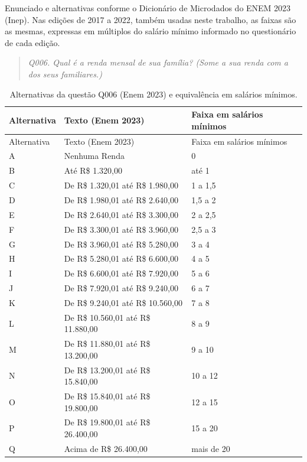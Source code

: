 \documentclass[12pt,a4paper]{article}
\begin{document}
Enunciado e alternativas conforme o Dicionário de Microdados do ENEM 2023
(Inep). Nas edições de 2017 a 2022, também usadas neste trabalho, as faixas são as
mesmas, expressas em múltiplos do salário mínimo informado no questionário de
cada edição.

\begin{quote}
\textit{Q006. Qual é a renda mensal de sua família? (Some a sua renda com a dos
seus familiares.)}
\end{quote}

\begin{small}
\begin{longtable}{@{}l l l@{}}
  \caption[Alternativas da questão Q006 (Enem 2023) em salários mínimos]{Alternativas da questão Q006 (Enem 2023) e equivalência em salários mínimos.}
  \label{tab:q006}\\
  \toprule
  Alternativa & Texto (Enem 2023) & Faixa em salários mínimos \\
  \midrule
  \endfirsthead
  \toprule
  Alternativa & Texto (Enem 2023) & Faixa em salários mínimos \\
  \midrule
  \endhead
  \bottomrule
  \endlastfoot
  A & Nenhuma Renda & 0 \\
  B & Até R\$ 1.320,00 & até 1 \\
  C & De R\$ 1.320,01 até R\$ 1.980,00 & 1 a 1,5 \\
  D & De R\$ 1.980,01 até R\$ 2.640,00 & 1,5 a 2 \\
  E & De R\$ 2.640,01 até R\$ 3.300,00 & 2 a 2,5 \\
  F & De R\$ 3.300,01 até R\$ 3.960,00 & 2,5 a 3 \\
  G & De R\$ 3.960,01 até R\$ 5.280,00 & 3 a 4 \\
  H & De R\$ 5.280,01 até R\$ 6.600,00 & 4 a 5 \\
  I & De R\$ 6.600,01 até R\$ 7.920,00 & 5 a 6 \\
  J & De R\$ 7.920,01 até R\$ 9.240,00 & 6 a 7 \\
  K & De R\$ 9.240,01 até R\$ 10.560,00 & 7 a 8 \\
  L & De R\$ 10.560,01 até R\$ 11.880,00 & 8 a 9 \\
  M & De R\$ 11.880,01 até R\$ 13.200,00 & 9 a 10 \\
  N & De R\$ 13.200,01 até R\$ 15.840,00 & 10 a 12 \\
  O & De R\$ 15.840,01 até R\$ 19.800,00 & 12 a 15 \\
  P & De R\$ 19.800,01 até R\$ 26.400,00 & 15 a 20 \\
  Q & Acima de R\$ 26.400,00 & mais de 20 \\
\end{longtable}
\end{small}
\end{document}
